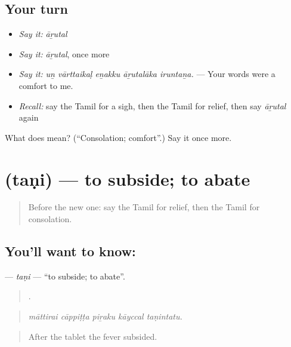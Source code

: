 \subsection*{Your turn}
\begin{itemize}
\raggedright
  \item \emph{Say it:} \emph{āṟutal}
  \item \emph{Say it:} \emph{āṟutal}, once more
  \item \emph{Say it:} \emph{uṉ vārttaikaḷ eṉakku āṟutalāka iruntaṉa.} — Your words were a comfort to me.
  \item \emph{Recall:} say the Tamil for a sigh, then the Tamil for relief, then say \emph{āṟutal} again
\end{itemize}

\begin{tcolorbox}[breakable,colback=teal!4,colframe=teal!35!black,title={Before you move on}]
What does  mean? (\textquotedblleft{}Consolation; comfort\textquotedblright{}.) Say it once more.
\end{tcolorbox}
\section[\texorpdfstring{\ta{தணி} (taṇi)}{தணி (taṇi)}]{ (taṇi) — to subside; to abate}

\label{lesson:TA-C456-tani}



\begin{quote}
Before the new one: say the Tamil for relief, then the Tamil for consolation.
\end{quote}

\subsection*{You'll want to know: }
\textbf{} — \emph{taṇi} — \textquotedblleft{}to subside; to abate\textquotedblright{}.

\begin{quote}
    .
\end{quote}

\begin{quote}
\emph{māttirai cāppiṭṭa piṟaku kāyccal taṇintatu.}
\end{quote}

\begin{quote}
After the tablet the fever subsided.
\end{quote}

